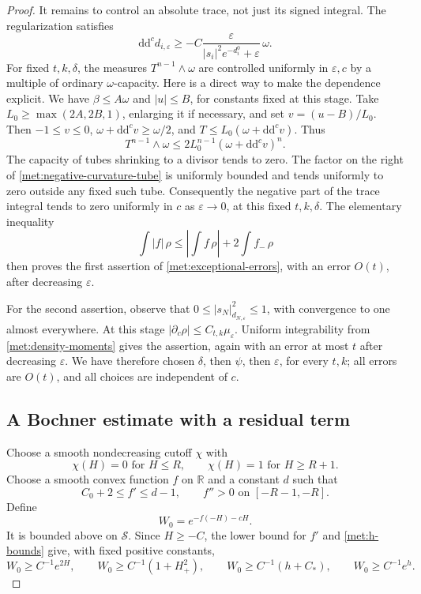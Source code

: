 \documentclass[11pt,letterpaper]{article}
\theoremstyle{definition}
\theoremstyle{remark}
\begin{document}
\begin{proof}
It remains to control an absolute trace, not just its signed integral.
The regularization satisfies
\begin{equation}
 \label{met:negative-curvature-tube}
 \mathrm{d}\mathrm{d}^{c} d_{i,\varepsilon}
 \geq-C\frac{\varepsilon}
 {|s_i|^2e^{-d_i^0}+\varepsilon}\,\omega.
\end{equation}
For fixed \(t,k,\delta\), the measures
\(T^{n-1}\wedge\omega\) are controlled uniformly in
\(\varepsilon,c\) by a multiple of ordinary \(\omega\)-capacity.
Here is a direct way to make the dependence explicit.  We have
\(\beta\leq A\omega\) and \(|u|\leq B\), for constants fixed at this
stage.  Take \(L_0\geq\max(2A,2B,1)\), enlarging it if necessary,
and set \(v=(u-B)/L_0\).  Then \(-1\leq v\leq0\),
\(\omega+\mathrm{d}\mathrm{d}^{c} v\geq\omega/2\), and
\(T\leq L_0(\omega+\mathrm{d}\mathrm{d}^{c} v)\).  Thus
\[
 T^{n-1}\wedge\omega
 \leq2L_0^{n-1}(\omega+\mathrm{d}\mathrm{d}^{c} v)^n.
\]
The capacity of tubes shrinking to a divisor tends to zero.  The
factor on the right of \eqref{met:negative-curvature-tube} is uniformly
bounded and tends uniformly to zero outside any fixed such tube.
Consequently the negative part of the trace integral tends to zero
uniformly in \(c\) as \(\varepsilon\to0\), at this fixed
\(t,k,\delta\).  The elementary inequality
\[
 \int|f|\,\rho
 \leq\left|\int f\,\rho\right|+2\int f_-\,\rho
\]
then proves the first assertion of \eqref{met:exceptional-errors},
with an error \(O(t)\), after decreasing \(\varepsilon\).

For the second assertion, observe that
\(0\leq|s_N|_{d_{N,\varepsilon}}^2\leq1\), with convergence to one
almost everywhere.  At this stage
\(|\partial_c\rho|\leq C_{t,k}\mu_\varepsilon\).
Uniform integrability from \eqref{met:density-moments} gives the
assertion, again with an error at most \(t\) after decreasing
\(\varepsilon\).  We have therefore chosen \(\delta\), then
\(\psi\), then \(\varepsilon\), for every \(t,k\); all errors are
\(O(t)\), and all choices are independent of \(c\).

\subsection*{A Bochner estimate with a residual term}

Choose a smooth nondecreasing cutoff \(\chi\) with
\[
 \chi(H)=0\text{ for }H\leq R,
 \qquad \chi(H)=1\text{ for }H\geq R+1.
\]
Choose a smooth convex function \(f\) on \(\mathbb{R}\) and a constant \(d\)
such that
\[
 C_0+2\leq f'\leq d-1,
 \qquad f''>0\text{ on }[-R-1,-R].
\]
Define
\begin{equation}
 \label{met:transport-weight}
 W_0=e^{-f(-H)-cH}.
\end{equation}
It is bounded above on \(\mathcal S\).  Since \(H\geq-C\), the lower
bound for \(f'\) and \eqref{met:h-bounds} give, with fixed positive
constants,
\begin{equation}
 \label{met:weight-domination}
 W_0\geq C^{-1}e^{2H},
 \qquad
 W_0\geq C^{-1}(1+H_+^2),
 \qquad
 W_0\geq C^{-1}(h+C_*),
 \qquad
 W_0\geq C^{-1}e^h.
\end{equation}


\end{proof}
\end{document}
